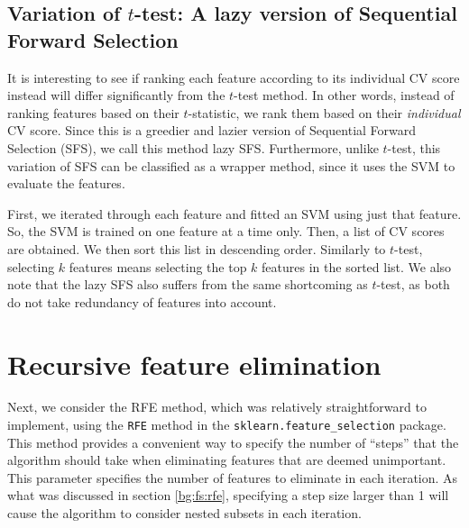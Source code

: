 \documentclass[12pt, twoside, a4paper]{report}
\begin{document}



\subsection{Variation of $t$-test: A lazy version of Sequential Forward Selection} \label{body:sfs:lazy}

It is interesting to see if ranking each feature according to its individual CV score instead will differ significantly from the $t$-test method. In other words, instead of ranking features based on their $t$-statistic, we rank them based on their \textit{individual} CV score. Since this is a greedier and lazier version of Sequential Forward Selection (SFS), we call this method lazy SFS. Furthermore, unlike $t$-test, this variation of SFS can be classified as a wrapper method, since it uses the SVM to evaluate the features.

First, we iterated through each feature and fitted an SVM using just that feature. So, the SVM is trained on one feature at a time only. Then, a list of CV scores are obtained. We then sort this list in descending order. Similarly to $t$-test, selecting $k$ features means selecting the top $k$ features in the sorted list. We also note that the lazy SFS also suffers from the same shortcoming as $t$-test, as both do not take redundancy of features into account.

\section{Recursive feature elimination} \label{body:rfe}

Next, we consider the RFE method, which was relatively straightforward to implement, using the \texttt{RFE} method in the \texttt{sklearn.feature\_selection} package. This method provides a convenient way to specify the number of ``steps'' that the algorithm should take when eliminating features that are deemed unimportant. This parameter specifies the number of features to eliminate in each iteration. As what was discussed in section \ref{bg:fs:rfe}, specifying a step size larger than 1 will cause the algorithm to consider nested subsets in each iteration.
\end{document}
